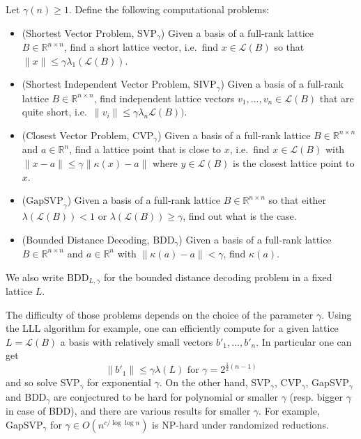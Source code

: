 \documentclass{report}
\newcommand{\R}{\mathbb{R}}
\begin{document}
\label{lattice_problems}
Let $\gamma(n) \geq 1$. Define the following computational problems:
\begin{itemize}
\item (Shortest Vector Problem, $\mathrm{SVP}_\gamma$) Given a basis of a full-rank lattice $B \in \R^{n \times n}$, find a short lattice vector, i.e.\ find $x \in \mathcal{L}(B)$ so that $\|x\| \leq \gamma \lambda_1(\mathcal{L}(B))$.
\item (Shortest Independent Vector Problem, $\mathrm{SIVP}_\gamma$) Given a basis of a full-rank lattice $B \in \R^{n \times n}$, find independent lattice vectors $v_1, ..., v_n \in \mathcal{L}(B)$ that are quite short, i.e.\ $\|v_i\| \leq \gamma \lambda_n{\mathcal{L}(B)})$.
\item (Closest Vector Problem, $\mathrm{CVP}_\gamma$) Given a basis of a full-rank lattice $B \in \R^{n \times n}$ and $a \in \R^n$, find a lattice point that is close to $x$, i.e.\ find $x \in \mathcal{L}(B)$ with $\|x - a\| \leq \gamma \|\kappa(x) - a\|$ where $y \in \mathcal{L}(B)$ is the closest lattice point to $x$.
\item ($\mathrm{GapSVP}_\gamma$) Given a basis of a full-rank lattice $B \in \R^{n \times n}$ so that either $\lambda(\mathcal{L}(B)) < 1$ or $\lambda(\mathcal{L}(B)) \geq \gamma$, find out what is the case.
\item (Bounded Distance Decoding, $\mathrm{BDD}_\gamma$) Given a basis of a full-rank lattice $B \in \R^{n \times n}$ and $a \in \R^n$ with $\|\kappa(a) - a\| < \gamma$, find $\kappa(a)$.
\end{itemize}
We also write $\mathrm{BDD}_{L, \gamma}$ for the bounded distance decoding problem in a fixed lattice $L$.

\remark[Difficulty]
The difficulty of those problems depends on the choice of the parameter $\gamma$. Using the LLL algorithm for example, one can efficiently compute for a given lattice $L = \mathcal{L}(B)$ a basis with relatively small vectors $b'_1, ..., b'_n$. In particular one can get 
\[\|b'_1\| \leq \gamma\lambda(L) \text{ for } \gamma = 2^{\frac 1 2 (n-1)}\]
and so solve SVP$_\gamma$ for exponential $\gamma$. 
On the other hand, SVP$_\gamma$, CVP$_\gamma$, GapSVP$_\gamma$ and BDD$_\gamma$ are conjectured to be hard for polynomial or smaller $\gamma$ (resp. bigger $\gamma$ in case of BDD), and there are various results for smaller $\gamma$. For example, GapSVP$_\gamma$ for $\gamma \in O(n^{c/\log\log n})$ is NP-hard under randomized reductions.
\end{document}
